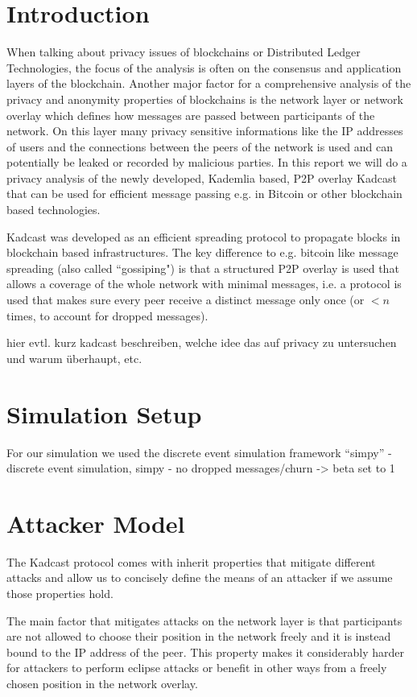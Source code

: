 \section{Introduction}
When talking about privacy issues of blockchains or Distributed Ledger Technologies, the
focus of the analysis is often on the consensus and application layers of the blockchain.
Another major factor for a comprehensive analysis of the privacy and anonymity properties
of blockchains is the network layer or network overlay which defines how messages are passed
between participants of the network. On this layer many privacy sensitive informations
like the IP addresses of users and the connections between the peers of the network
is used and can potentially be leaked or recorded by malicious parties.
In this report we will do a privacy analysis of the newly developed, Kademlia based,
P2P overlay Kadcast that can be used for efficient message passing
e.g. in Bitcoin or other blockchain based technologies.

Kadcast was developed as an efficient spreading protocol to propagate blocks in blockchain based infrastructures.
The key difference to e.g. bitcoin like message spreading (also called ``gossiping")
is that a structured P2P overlay is used that allows a coverage of the whole network with minimal messages,
i.e. a protocol is used that makes sure every peer receive a distinct message only once
(or $<n$ times, to account for dropped messages). %

hier evtl. kurz kadcast beschreiben, welche idee das auf privacy zu untersuchen und warum überhaupt, etc.

\section{Simulation Setup}
For our simulation we used the discrete event simulation framework ``simpy''
- discrete event simulation, simpy
- no dropped messages/churn -> beta set to 1


\section{Attacker Model}
The Kadcast protocol comes with inherit properties that mitigate different attacks
and allow us to concisely define the means of an attacker if we assume those properties hold.

The main factor that mitigates attacks on the network layer is that participants are
not allowed to choose their position in the network freely and it is instead bound to the IP address of the peer.
This property makes it considerably harder for attackers to perform eclipse attacks or benefit in other ways from
a freely chosen position in the network overlay.


